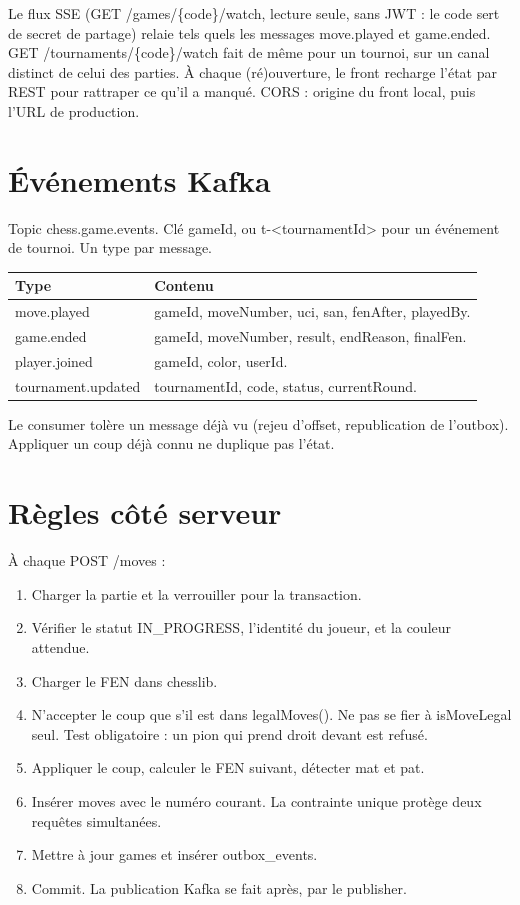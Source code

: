 \documentclass[11pt,a4paper]{article}
\newcommand{\field}[1]{{\ttfamily #1}}
\begin{document}
Le flux SSE (\field{GET /games/\{code\}/watch}, lecture seule, sans JWT : le code sert de secret de partage) relaie tels quels les messages \field{move.played} et \field{game.ended}. \field{GET /tournaments/\{code\}/watch} fait de même pour un tournoi, sur un canal distinct de celui des parties. À chaque (ré)ouverture, le front recharge l'état par REST pour rattraper ce qu'il a manqué. CORS : origine du front local, puis l'URL de production.

\section{Événements Kafka}

Topic \field{chess.game.events}. Clé \field{gameId}, ou \field{t-<tournamentId>} pour un événement de tournoi. Un type par message.

\begin{tabularx}{\linewidth}{@{}Y L@{}}
\toprule
Type & Contenu \\
\midrule
\field{move.played} & gameId, moveNumber, uci, san, fenAfter, playedBy. \\
\field{game.ended} & gameId, moveNumber, result, endReason, finalFen. \\
\field{player.joined} & gameId, color, userId. \\
\field{tournament.updated} & tournamentId, code, status, currentRound. \\
\bottomrule
\end{tabularx}

Le consumer tolère un message déjà vu (rejeu d'offset, republication de l'outbox). Appliquer un coup déjà connu ne duplique pas l'état.

\section{Règles côté serveur}

À chaque \field{POST /moves} :

\begin{enumerate}
  \item Charger la partie et la verrouiller pour la transaction.
  \item Vérifier le statut \field{IN\_PROGRESS}, l'identité du joueur, et la couleur attendue.
  \item Charger le FEN dans chesslib.
  \item N'accepter le coup que s'il est dans \field{legalMoves()}. Ne pas se fier à \field{isMoveLegal} seul. Test obligatoire : un pion qui prend droit devant est refusé.
  \item Appliquer le coup, calculer le FEN suivant, détecter mat et pat.
  \item Insérer \field{moves} avec le numéro courant. La contrainte unique protège deux requêtes simultanées.
  \item Mettre à jour \field{games} et insérer \field{outbox\_events}.
  \item Commit. La publication Kafka se fait après, par le publisher.
\end{enumerate}
\end{document}
